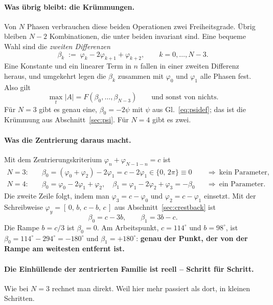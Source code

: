 \documentclass[11pt,a4paper]{article}
\begin{document}
\paragraph{Was übrig bleibt: die Krümmungen.}
Von $N$ Phasen verbrauchen diese beiden Operationen zwei Freiheitsgrade.
Übrig bleiben $N-2$ Kombinationen, die unter beiden invariant sind. Eine
bequeme Wahl sind die \emph{zweiten Differenzen}
\begin{equation}
  \beta_k \;:=\; \varphi_k - 2\varphi_{k+1} + \varphi_{k+2},
  \qquad k = 0,\dots,N-3 .
  \label{eq:betadef}
\end{equation}
Eine Konstante und ein linearer Term in $n$ fallen in einer zweiten Differenz
heraus, und umgekehrt legen die $\beta_k$ zusammen mit $\varphi_0$ und
$\varphi_1$ alle Phasen fest. Also gilt
\begin{equation}
  \max_t|A| = F(\beta_0,\dots,\beta_{N-3})
  \qquad\text{und sonst von nichts.}
\end{equation}
Für $N=3$ gibt es genau eine, $\beta_0 = -2\psi$ mit $\psi$ aus
Gl.~\eqref{eq:psidef}; das ist die Krümmung aus
Abschnitt~\ref{sec:psi}. Für $N=4$ gibt es zwei.

\paragraph{Was die Zentrierung daraus macht.}
Mit dem Zentrierungskriterium $\varphi_n+\varphi_{N-1-n}=c$ ist
\begin{align}
  N=3:&\quad \beta_0 = (\varphi_0+\varphi_2) - 2\varphi_1 = c - 2\varphi_1
        \in \{0,\,2\pi\} \equiv 0
        &&\Rightarrow\ \text{kein Parameter},\\
  N=4:&\quad \beta_0 = \varphi_0-2\varphi_1+\varphi_2,\quad
        \beta_1 = \varphi_1-2\varphi_2+\varphi_3 = -\beta_0
        &&\Rightarrow\ \text{ein Parameter}.
\end{align}
Die zweite Zeile folgt, indem man $\varphi_3=c-\varphi_0$ und
$\varphi_2=c-\varphi_1$ einsetzt. Mit der Schreibweise
$\varphi_y=[\,0,\,b,\,c-b,\,c\,]$ aus Abschnitt~\ref{sec:crestback} ist
\begin{equation}
  \beta_0 = c - 3b, \qquad \beta_1 = 3b - c .
\end{equation}
Die Rampe $b=c/3$ ist $\beta_0=0$. Am Arbeitspunkt, $c=114^\circ$ und
$b=98^\circ$, ist $\beta_0 = 114^\circ-294^\circ = -180^\circ$ und
$\beta_1=+180^\circ$: \textbf{genau der Punkt, der von der Rampe am weitesten
entfernt ist.}

\paragraph{Die Einhüllende der zentrierten Familie ist reell -- Schritt für Schritt.}
Wie bei $N=3$ rechnet man direkt. Weil hier mehr passiert als dort, in
kleinen Schritten.
\end{document}
